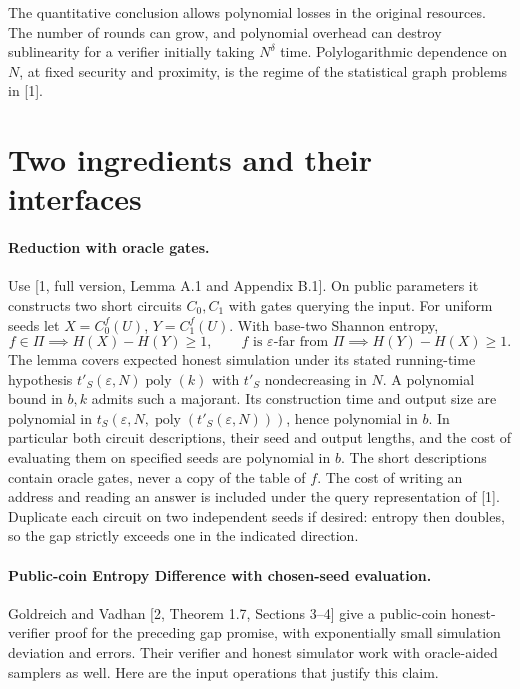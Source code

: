 \documentclass[11pt]{article}
\begin{document}
The quantitative conclusion allows polynomial losses in the original resources. The number of rounds can grow, and polynomial overhead can destroy sublinearity for a verifier initially taking $N^\delta$ time. Polylogarithmic dependence on $N$, at fixed security and proximity, is the regime of the statistical graph problems in [1].

\section{Two ingredients and their interfaces}
\paragraph{Reduction with oracle gates.}
Use [1, full version, Lemma A.1 and Appendix B.1]. On public parameters it constructs two short circuits $C_0,C_1$ with gates querying the input. For uniform seeds let $X=C_0^f(U)$, $Y=C_1^f(U)$. With base-two Shannon entropy,
\[
 f\in\Pi\implies H(X)-H(Y)\ge1,\qquad
 f\text{ is }\varepsilon\text{-far from }\Pi\implies H(Y)-H(X)\ge1 .
\]
The lemma covers expected honest simulation under its stated running-time hypothesis $t'_S(\varepsilon,N)\operatorname{poly}(k)$ with $t'_S$ nondecreasing in $N$. A polynomial bound in $b,k$ admits such a majorant. Its construction time and output size are polynomial in $t_S(\varepsilon,N,\operatorname{poly}(t'_S(\varepsilon,N)))$, hence polynomial in $b$. In particular both circuit descriptions, their seed and output lengths, and the cost of evaluating them on specified seeds are polynomial in $b$. The short descriptions contain oracle gates, never a copy of the table of $f$. The cost of writing an address and reading an answer is included under the query representation of [1]. Duplicate each circuit on two independent seeds if desired: entropy then doubles, so the gap strictly exceeds one in the indicated direction.

\paragraph{Public-coin Entropy Difference with chosen-seed evaluation.}
Goldreich and Vadhan [2, Theorem 1.7, Sections 3--4] give a public-coin honest-verifier proof for the preceding gap promise, with exponentially small simulation deviation and errors. Their verifier and honest simulator work with oracle-aided samplers as well. Here are the input operations that justify this claim.
\end{document}

